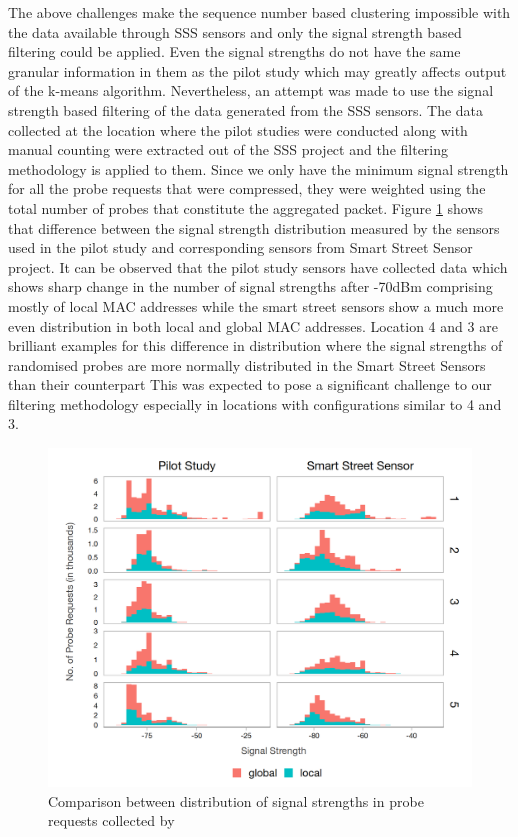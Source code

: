 The above challenges make the sequence number based clustering impossible with the data available through SSS sensors and only the signal strength based filtering could be applied. 
Even the signal strengths do not have the same granular information in them as the pilot study which may greatly affects output of the k-means algorithm.
Nevertheless, an attempt was made to use the signal strength based filtering of the data generated from the SSS sensors.
The data collected at the location where the pilot studies were conducted along with manual counting were extracted out of the SSS project and the filtering methodology is applied to them.
Since we only have the minimum signal strength for all the probe requests that were compressed, they were weighted using the total number of probes that constitute the aggregated packet.
Figure \ref{figure:processing:sss:signals} shows that difference between the signal strength distribution measured by the sensors used in the pilot study and corresponding sensors from Smart Street Sensor project.
It can be observed that the pilot study sensors have collected data which shows sharp change in the number of signal strengths after -70dBm comprising mostly of local MAC addresses while the smart street sensors show a much more even distribution in both local and global MAC addresses.
Location 4 and 3 are brilliant examples for this difference in distribution where the signal strengths of randomised probes are more normally distributed in the Smart Street Sensors than their counterpart
This was expected to pose a significant challenge to our filtering methodology especially in locations with configurations similar to 4 and 3.

\begin{figure}
  \includegraphics[trim={5 5 5 5}, clip]{images/processing-sss-signalsnew.png}
  \caption{Comparison between distribution of signal strengths in probe requests collected by }
  \label{figure:processing:sss:signals}
\end{figure}

